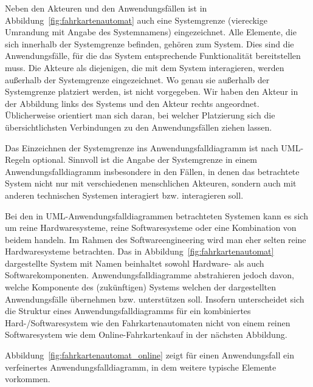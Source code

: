 Neben den Akteuren und den Anwendungsfällen ist in Abbildung~\ref{fig:fahrkartenautomat} auch eine System\-grenze
(viereckige Umrandung mit Angabe des Systemnamens) eingezeichnet. Alle Elemente, die sich innerhalb der Systemgrenze befinden, gehören zum System. Dies sind die Anwendungsfälle, für die das System entsprechende Funktionalität bereitstellen muss. Die Akteure als diejenigen, die mit dem System interagieren, werden außerhalb der Systemgrenze eingezeichnet. Wo genau sie außerhalb der System\-grenze platziert werden, ist nicht vorgegeben. Wir haben den Akteur  in der Abbildung links des Systems und den Akteur  rechts angeordnet. Üblicherweise orientiert man sich daran, bei welcher Platzierung sich die übersichtlichsten Verbindungen zu den Anwendungsfällen ziehen lassen.

Das Einzeichnen der Systemgrenze ins Anwendungsfalldiagramm ist nach UML-Regeln optional. Sinnvoll ist die Angabe der Systemgrenze in einem Anwendungsfalldiagramm insbesondere in den Fällen, in denen das betrachtete System nicht nur mit verschiedenen menschlichen Akteuren, sondern auch mit anderen technischen Systemen interagiert bzw. interagieren soll.

Bei den in UML-Anwendungsfalldiagrammen betrachteten Systemen kann es sich um reine Hardwaresysteme, reine Softwaresysteme oder eine Kombination von beidem handeln. Im Rahmen des Softwareengineering wird man eher selten reine Hardwaresysteme betrachten. Das in Abbildung~\ref{fig:fahrkartenautomat} dargestellte System mit Namen  beinhaltet sowohl Hardware- als auch Softwarekomponenten. Anwendungsfalldiagramme abstrahieren jedoch davon, welche Komponente des (zukünftigen) Systems welchen der dargestellten Anwendungsfälle  übernehmen bzw. unterstützen soll. Insofern unterscheidet sich die Struktur eines Anwendungsfall\-diagramms für ein kombiniertes Hard-/Softwaresystem wie den Fahrkartenautomaten nicht von einem reinen Softwaresystem wie dem Online-Fahrkartenkauf in der nächsten Abbildung.


Abbildung~\ref{fig:fahrkartenautomat_online} zeigt für einen Anwendungsfall  ein verfeinertes Anwendungsfalldiagramm, in dem weitere typische Elemente vorkommen.


